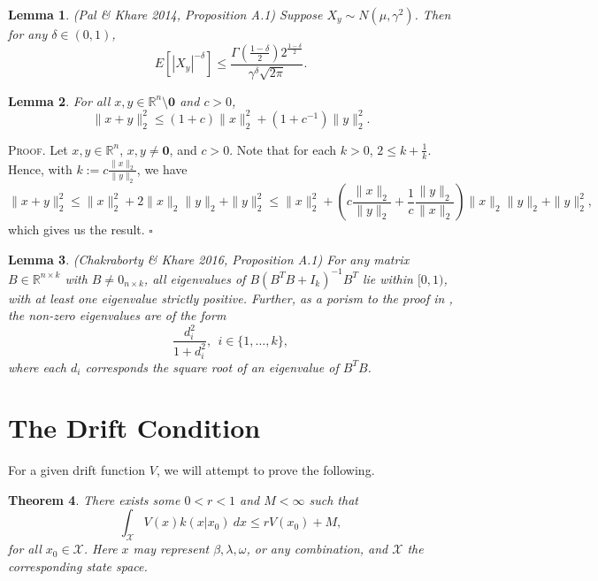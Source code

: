\documentclass[12pt]{article}
\newtheorem{theorem}{Theorem}
\newtheorem{lemma}[theorem]{Lemma}
\newcounter{ProofCounter}
\newenvironment{Proof}{\stepcounter{ProofCounter}\textsc{Proof.}}{\hfill$\square$}
\numberwithin{equation}{section}
\begin{document}
\begin{lemma}
  (Pal \& Khare 2014, Proposition A.1)
  Suppose $X_{y} \sim N(\mu, \gamma^2)$. Then for any $\delta \in (0,1)$, 
  \[
    E\left[ |X_{y}|^{-\delta} \right] \leq \frac{\Gamma\left( \frac{1-\delta}{2} \right) 2^{\frac{1-\delta}{2}}}{\gamma^\delta \sqrt{2\pi}}.
  \]
  \label{l6}
\end{lemma}

\begin{lemma}
  For all $x,y \in \mathbb{R}^n \setminus \bm{0}$ and $c > 0$, 
  \[
    \|x + y\|_2^2 \leq (1 + c) \|x\|_2^2 + (1 + c^{-1})\|y\|_2^2.
  \]
  \label{l7}
\end{lemma}
\begin{Proof}
  Let $x, y \in \mathbb{R}^n$, $x, y \neq \bm{0}$, and $c > 0$. Note that for each $k > 0$, $2 \leq k + \frac{1}{k}$. Hence, with $k := c \frac{\|x\|_2}{\|y\|_2}$, we have
  \[
    \|x + y\|_2^2 \leq \|x\|_2^2 + 2\|x\|_2 \|y\|_2 + \|y\|_2^2 \leq \|x\|_2^2 + \left( c\frac{\|x\|_2}{\|y\|_2} + \frac{1}{c}\frac{\|y\|_2}{\|x\|_2}
    \right)\|x\|_2 \|y\|_2 + \|y\|_2^2,
  \]
  which gives us the result.
\end{Proof} \\

\begin{lemma}
  (Chakraborty \& Khare 2016, Proposition A.1)
  For any matrix $B \in \mathbb{R}^{n\times k}$ with $B \neq 0_{n\times k}$, all eigenvalues of $B(B^T B + I_{k})^{-1}B^T$ lie within $[0,1)$, with at
  least one eigenvalue strictly positive. Further, as a porism to the proof in \cite{probit}, the non-zero eigenvalues are of the form 
  \[
    \frac{d_i^2}{1 + d_i^2}, \ \ i \in\{ 1, \dots, k\},
  \]
  where each $d_i$ corresponds the square root of an eigenvalue of $B^T B$.
  \label{l8}
\end{lemma}



\newpage

\section{The Drift Condition}

For a given drift function $V$, we will attempt to prove the following. \\

\begin{theorem}
  There exists some $0 < r < 1$ and $M < \infty$ such that 
  \[
    \int_{\mathcal{X}} V(x)k(x|x_0)\ dx \leq r V(x_0) + M,
  \]
  for all $x_0 \in \mathcal{X}$. Here $x$ may represent $\beta, \lambda, \omega$, or any combination, and $\mathcal{X}$ the corresponding state space.
  \label{thm1}
\end{theorem}
\end{document}
